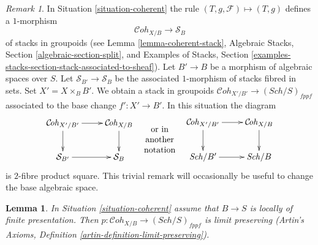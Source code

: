 \documentclass{stacks-project}
\theoremstyle{plain}
\newtheorem{lemma}[subsection]{Lemma}
\theoremstyle{definition}
\theoremstyle{remark}
\newtheorem{remark}[subsection]{Remark}
\numberwithin{equation}{subsection}
\def\Sch{\mathit{Sch}}
\def\Cohstack{\mathcal{C}\!\mathit{oh}}
\begin{document}
\begin{remark}
\label{remark-coherent-base-change}
In Situation \ref{situation-coherent} the rule
$(T, g, \mathcal{F}) \mapsto (T, g)$ defines a $1$-morphism
$$
\Cohstack_{X/B} \longrightarrow \mathcal{S}_B
$$
of stacks in groupoids
(see Lemma \ref{lemma-coherent-stack},
Algebraic Stacks, Section \ref{algebraic-section-split}, and
Examples of Stacks, Section
\ref{examples-stacks-section-stack-associated-to-sheaf}).
Let $B' \to B$ be a morphism of
algebraic spaces over $S$. Let $\mathcal{S}_{B'} \to \mathcal{S}_B$
be the associated $1$-morphism of stacks fibred in sets.
Set $X' = X \times_B B'$.
We obtain a stack in groupoids $\Cohstack_{X'/B'} \to (\Sch/S)_{fppf}$
associated to the base change $f' : X' \to B'$. In this situation
the diagram
$$
\vcenter{
\xymatrix{
\Cohstack_{X'/B'} \ar[r] \ar[d] & \Cohstack_{X/B} \ar[d] \\
\mathcal{S}_{B'} \ar[r] & \mathcal{S}_B
}
}
\quad
\begin{matrix}
\text{or in} \\
\text{another} \\
\text{notation}
\end{matrix}
\quad
\vcenter{
\xymatrix{
\Cohstack_{X'/B'} \ar[r] \ar[d] & \Cohstack_{X/B} \ar[d] \\
\Sch/B' \ar[r] & \Sch/B
}
}
$$
is $2$-fibre product square. This trivial remark
will occasionally be useful to change the base algebraic space.
\end{remark}

\begin{lemma}
\label{lemma-coherent-limits}
In Situation \ref{situation-coherent} assume that $B \to S$
is locally of finite presentation. Then
$p : \Cohstack_{X/B} \to (\Sch/S)_{fppf}$ is limit preserving
(Artin's Axioms, Definition \ref{artin-definition-limit-preserving}).
\end{lemma}
\end{document}
